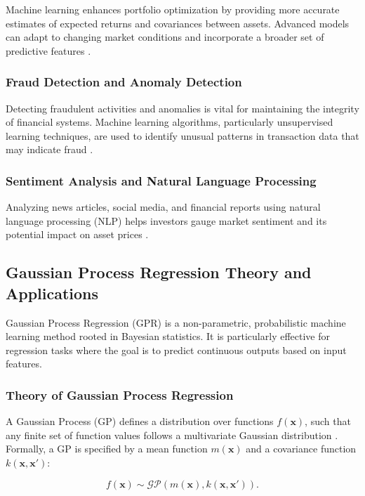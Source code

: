 Machine learning enhances portfolio optimization by providing more accurate estimates of expected returns and covariances between assets. Advanced models can adapt to changing market conditions and incorporate a broader set of predictive features \cite{heaton2017deep}.

\subsubsection{Fraud Detection and Anomaly Detection}

Detecting fraudulent activities and anomalies is vital for maintaining the integrity of financial systems. Machine learning algorithms, particularly unsupervised learning techniques, are used to identify unusual patterns in transaction data that may indicate fraud \cite{phua2010comprehensive}.

\subsubsection{Sentiment Analysis and Natural Language Processing}

Analyzing news articles, social media, and financial reports using natural language processing (NLP) helps investors gauge market sentiment and its potential impact on asset prices \cite{hagenau2013automated}.

\subsection{Gaussian Process Regression Theory and Applications}

Gaussian Process Regression (GPR) is a non-parametric, probabilistic machine learning method rooted in Bayesian statistics. It is particularly effective for regression tasks where the goal is to predict continuous outputs based on input features.

\subsubsection{Theory of Gaussian Process Regression}

A Gaussian Process (GP) defines a distribution over functions $f(\mathbf{x})$, such that any finite set of function values follows a multivariate Gaussian distribution \cite{rasmussen2006gaussian}. Formally, a GP is specified by a mean function $m(\mathbf{x})$ and a covariance function $k(\mathbf{x}, \mathbf{x}')$:

\begin{equation}
f(\mathbf{x}) \sim \mathcal{GP}\left( m(\mathbf{x}), k(\mathbf{x}, \mathbf{x}') \right).
\end{equation}

